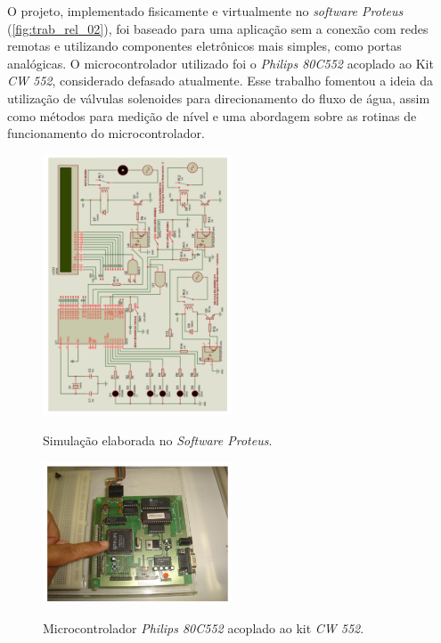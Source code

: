 O projeto, implementado fisicamente e virtualmente no \textit{software Proteus} (\autoref{fig:trab_rel_02}), foi baseado para uma aplicação sem a conexão com redes remotas e utilizando componentes eletrônicos mais simples, como portas analógicas. O microcontrolador utilizado foi o \textit{Philips 80C552} acoplado ao Kit \textit{CW 552}, considerado defasado atualmente. Esse trabalho fomentou a ideia da utilização de válvulas solenoides para direcionamento do fluxo de água, assim como métodos para medição de nível e uma abordagem sobre as rotinas de funcionamento do microcontrolador.

\begin{figure}[H]
	\centering
	\caption{Simulação elaborada no \textit{Software Proteus}.}
	\includegraphics[width=0.5\textwidth, angle=-90]{figuras/trabalhos_relacionados/fig02.png}
	\label{fig:trab_rel_02}
\end{figure}

\begin{figure}[H]
	\centering
	\caption{Microcontrolador \textit{Philips 80C552} acoplado ao kit \textit{CW 552}.}
	\includegraphics[width=0.5\textwidth]{figuras/trabalhos_relacionados/fig03.png}
	\label{fig:trab_rel_03}
\end{figure}

